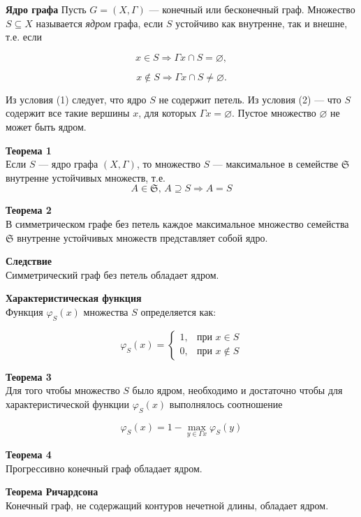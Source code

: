 \textbf{Ядро графа}
Пусть $G = (X, \Gamma)$ — конечный или бесконечный граф. Множество $S \subseteq X$ называется \textit{ядром} графа, если $S$ устойчиво как внутренне, так и внешне, т.е. если

\begin{equation}
x \in S \Rightarrow \Gamma x \cap S = \varnothing,
\end{equation}

\begin{equation}
x \notin S \Rightarrow \Gamma x \cap S \neq \varnothing.
\end{equation}

Из условия (1) следует, что ядро $S$ не содержит петель. Из условия (2) — что $S$ содержит все такие вершины $x$, для которых $\Gamma x = \varnothing$. Пустое множество $\varnothing$ не может быть ядром.

\textbf{Теорема 1} \\
Если $S$ — ядро графа $(X, \Gamma)$, то множество $S$ — максимальное в семействе $\mathfrak{S}$ внутренне устойчивых множеств, т.е.
\[
A \in \mathfrak{S}, \, A \supseteq S \Rightarrow A = S
\]

\textbf{Теорема 2} \\
В симметрическом графе без петель каждое максимальное множество семейства $\mathfrak{S}$ внутренне устойчивых множеств представляет собой ядро.

\textbf{Следствие} \\
Симметрический граф без петель обладает ядром.

\textbf{Характеристическая функция} \\
Функция $\varphi_S(x)$ множества $S$ определяется как:

\[
\varphi_S(x) = 
\begin{cases} 
1, & \text{при } x \in S \\ 
0, & \text{при } x \notin S 
\end{cases}
\]

\textbf{Теорема 3} \\
Для того чтобы множество $S$ было ядром, необходимо и достаточно чтобы для характеристической функции $\varphi_S(x)$ выполнялось соотношение

\[
\varphi_S(x) = 1 - \max_{y \in \Gamma x} \varphi_S(y)
\]

\textbf{Теорема 4} \\
Прогрессивно конечный граф обладает ядром.

\textbf{Теорема Ричардсона} \\
Конечный граф, не содержащий контуров нечетной длины, обладает ядром.
